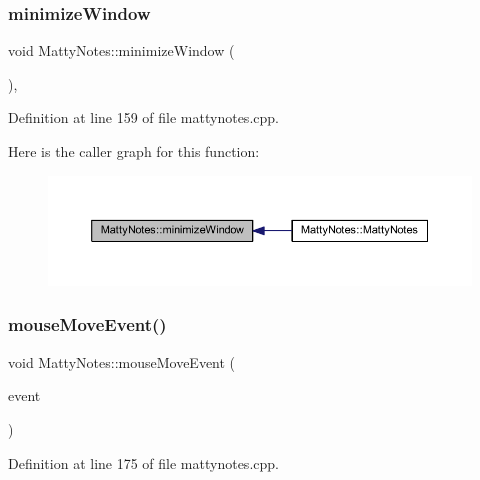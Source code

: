 \subsubsection{\texorpdfstring{minimize\+Window}{minimizeWindow}}
{\footnotesize\ttfamily void Matty\+Notes\+::minimize\+Window (\begin{DoxyParamCaption}{ }\end{DoxyParamCaption})\hspace{0.3cm}{\ttfamily [private]}, {\ttfamily [slot]}}



Definition at line 159 of file mattynotes.\+cpp.

Here is the caller graph for this function\+:
\nopagebreak
\begin{figure}[H]
\begin{center}
\leavevmode
\includegraphics[width=350pt]{classMattyNotes_a59034e42bf605fafd6b37e513b6f85fb_icgraph}
\end{center}
\end{figure}
\hypertarget{classMattyNotes_a0b9d1b50929a097d705e211b57fb12d0}{}\label{classMattyNotes_a0b9d1b50929a097d705e211b57fb12d0} 
\subsubsection{\texorpdfstring{mouse\+Move\+Event()}{mouseMoveEvent()}}
{\footnotesize\ttfamily void Matty\+Notes\+::mouse\+Move\+Event (\begin{DoxyParamCaption}\item[{Q\+Mouse\+Event $\ast$}]{event }\end{DoxyParamCaption})\hspace{0.3cm}{\ttfamily [private]}}



Definition at line 175 of file mattynotes.\+cpp.

\hypertarget{classMattyNotes_a4818a8cc2dbd824bc005034cb2656198}{}\label{classMattyNotes_a4818a8cc2dbd824bc005034cb2656198} 
